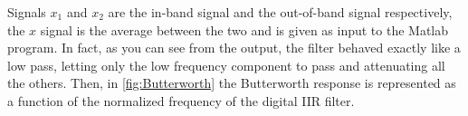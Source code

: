 Signals $x_{1}$ and $x_{2}$ are the in-band signal and the out-of-band signal respectively, the $x$ signal is the average between the two and is given as input to the Matlab program. In fact, as you can see from the output, the filter behaved exactly like a low pass, letting only the low frequency component to pass and attenuating all the others. Then, in \autoref{fig:Butterworth} the Butterworth response is represented as a function of the normalized frequency of the digital IIR filter.